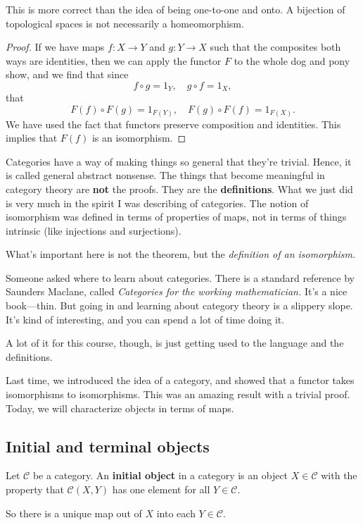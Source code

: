 This is more correct than the idea of being one-to-one and onto. A bijection of
topological spaces is not necessarily a homeomorphism.


\begin{proof} 
If we have maps $f: X \to Y$ and $g : Y \to X$ such that the composites both
ways are identities, then we can apply the functor $F$ to the whole dog and
pony show, and we find that since
\[ f \circ g = 1_Y, \quad g \circ f = 1_X,   \]
that
\[ F(f) \circ F(g) = 1_{F(Y)}, \quad F(g) \circ F(f) = 1_{F(X)}.  \]
We have used the fact that functors preserve composition and identities. This
implies that $F(f)$ is an isomorphism. 
\end{proof} 

Categories have a way of making things so general that they're trivial. Hence,
it is called general abstract nonsense. The things that become meaningful in
category theory are \textbf{not} the proofs. They are the \textbf{definitions}.
What we just did is very much in the spirit I was describing of categories. The
notion of isomorphism was defined in terms of properties of maps, not in terms
of things intrinsic (like injections and surjections). 

What's important here is not the theorem, but the \emph{definition of an
isomorphism.}




Someone asked where to learn about categories. There is a standard reference by
Saunders Maclane, called \emph{Categories for the working mathematician.}  It's
a nice book---thin. But going in and learning about category theory is a
slippery slope. It's kind of interesting, and you can spend a lot of time doing
it. 

A lot of it for this course, though, is just getting used to the language and
the definitions.  


Last time, we introduced the idea of a category, and showed that a functor
takes isomorphisms to isomorphisms.  This was an amazing result with a trivial
proof.  Today, we will characterize objects in terms of maps.

\subsection{Initial and terminal objects}

\begin{definition} 
Let $\mathcal{C}$ be a category. An \textbf{initial object} in a category is an
object $X \in \mathcal{C}$ with the property that $\mathcal{C}(X, Y)$ has one
element for all $Y \in \mathcal{C}$. 

So there is a unique map out of $X$ into each $Y \in \mathcal{C}$. 
\end{definition} 


